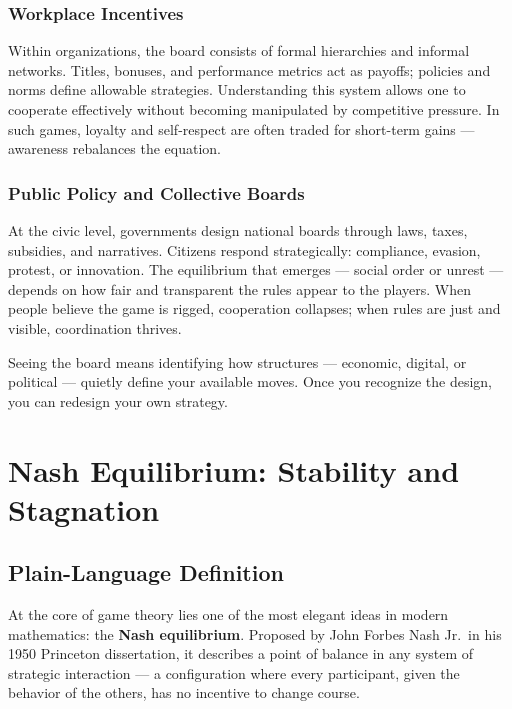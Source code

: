 \documentclass[12pt,twoside]{book}
\begin{document}
\subsection*{Workplace Incentives}
Within organizations, the board consists of formal hierarchies and informal networks.  
Titles, bonuses, and performance metrics act as payoffs; policies and norms define allowable strategies.  
Understanding this system allows one to cooperate effectively without becoming manipulated by competitive pressure.  
In such games, loyalty and self-respect are often traded for short-term gains --- awareness rebalances the equation.

\subsection*{Public Policy and Collective Boards}
At the civic level, governments design national boards through laws, taxes, subsidies, and narratives.  
Citizens respond strategically: compliance, evasion, protest, or innovation.  
The equilibrium that emerges --- social order or unrest --- depends on how fair and transparent the rules appear to the players.  
When people believe the game is rigged, cooperation collapses; when rules are just and visible, coordination thrives. \\

\begin{keyidea}
Seeing the board means identifying how structures --- economic, digital, or political --- quietly define your available moves.  
Once you recognize the design, you can redesign your own strategy.
\end{keyidea}

\chapter{Nash Equilibrium: Stability and Stagnation}

\section{Plain-Language Definition}

At the core of game theory lies one of the most elegant ideas in modern mathematics: the \textbf{Nash equilibrium}.  
Proposed by John Forbes Nash Jr.\ in his 1950 Princeton dissertation, it describes a point of balance in any system of strategic interaction — a configuration where every participant, given the behavior of the others, has no incentive to change course.  
\end{document}
